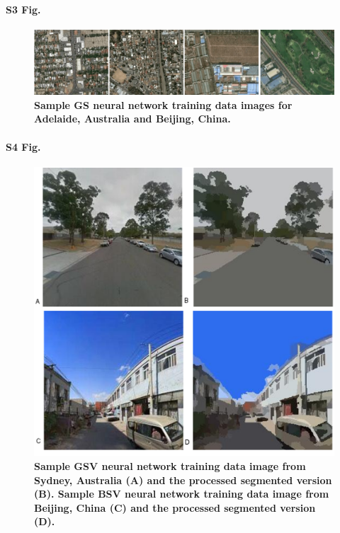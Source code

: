 \documentclass[10pt,letterpaper,hidelinks]{article}
\begin{document}
\paragraph*{S3 Fig.}
\begin{figure}[!htbp]
    \centering 
    \includegraphics[scale=1]{Images/PlosOne/Fig3.png}     
\caption{\bf Sample GS neural network training data images for Adelaide, Australia and Beijing, China. \cite{GoogleStatic2017}}    
 \label{fig:satbeiade}  
\end{figure} 



\paragraph*{S4 Fig.}
\begin{figure}[!htbp]
\includegraphics[scale=0.3]{Images/PlosOne/Fig4.png} 
\caption{\bf Sample GSV neural network training data image from Sydney, Australia \cite{GoogleMaps2017b} (A) and the processed segmented version (B). Sample BSV neural network training data image from Beijing, China \cite{Baidu2017} (C) and the processed segmented version (D).}    
 \label{fig:gsvbsv}  
\end{figure} 
\end{document}
